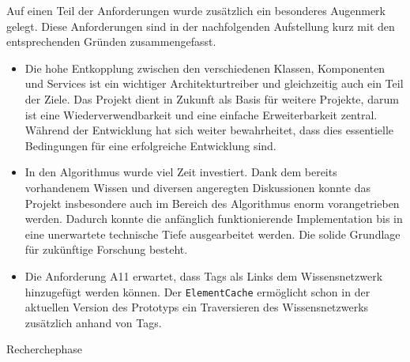 Auf einen Teil der Anforderungen wurde zusätzlich ein besonderes Augenmerk gelegt. Diese Anforderungen sind in der nachfolgenden Aufstellung kurz mit den entsprechenden Gründen zusammengefasst.

\begin{itemize}
    \item Die hohe Entkopplung zwischen den verschiedenen Klassen, Komponenten und Services ist ein wichtiger Architekturtreiber und gleichzeitig auch ein Teil der Ziele. Das Projekt dient in Zukunft als Basis für weitere Projekte, darum ist eine Wiederverwendbarkeit und eine einfache Erweiterbarkeit zentral. Während der Entwicklung hat sich weiter bewahrheitet, dass dies essentielle Bedingungen für eine erfolgreiche Entwicklung sind.
    \item In den Algorithmus wurde viel Zeit investiert. Dank dem bereits vorhandenem Wissen und diversen angeregten Diskussionen konnte das Projekt insbesondere auch im Bereich des Algorithmus enorm vorangetrieben werden. Dadurch konnte die anfänglich funktionierende Implementation bis in eine unerwartete technische Tiefe ausgearbeitet werden. Die solide Grundlage für zukünftige Forschung besteht.
    \item Die Anforderung A11 erwartet, dass Tags als Links dem Wissensnetzwerk hinzugefügt werden können. Der \texttt{ElementCache} ermöglicht schon in der aktuellen Version des Prototyps ein Traversieren des Wissensnetzwerks zusätzlich anhand von Tags.
\end{itemize}




Recherchephase


